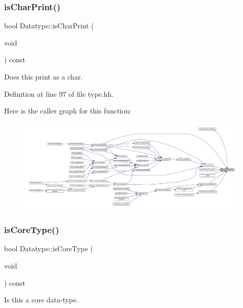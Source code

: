 \subsubsection{\texorpdfstring{isCharPrint()}{isCharPrint()}}
{\footnotesize\ttfamily bool Datatype\+::is\+Char\+Print (\begin{DoxyParamCaption}\item[{void}]{ }\end{DoxyParamCaption}) const\hspace{0.3cm}{\ttfamily [inline]}}



Does this print as a \textquotesingle{}char\textquotesingle{}. 



Definition at line 97 of file type.\+hh.

Here is the caller graph for this function\+:
\nopagebreak
\begin{figure}[H]
\begin{center}
\leavevmode
\includegraphics[width=350pt]{class_datatype_a9d1f2c6f358067cce0fea04e9a55a757_icgraph}
\end{center}
\end{figure}
\mbox{\label{class_datatype_a15ae1519c41266c3af2b06392b75e1ba}} 
\subsubsection{\texorpdfstring{isCoreType()}{isCoreType()}}
{\footnotesize\ttfamily bool Datatype\+::is\+Core\+Type (\begin{DoxyParamCaption}\item[{void}]{ }\end{DoxyParamCaption}) const\hspace{0.3cm}{\ttfamily [inline]}}



Is this a core data-\/type. 



